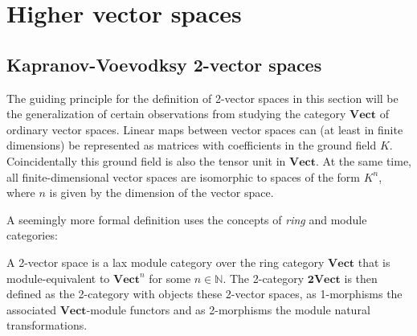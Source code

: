 \section{Higher vector spaces}
\subsection{Kapranov-Voevodksy 2-vector spaces}

    The guiding principle for the definition of 2-vector spaces in this section will be the generalization of certain observations from studying the category $\mathbf{Vect}$ of ordinary vector spaces. Linear maps between vector spaces can (at least in finite dimensions) be represented as matrices with coefficients in the ground field $K$. Coincidentally this ground field is also the tensor unit in $\mathbf{Vect}$. At the same time, all finite-dimensional vector spaces are isomorphic to spaces of the form $K^n$, where $n$ is given by the dimension of the vector space.


    A seemingly more formal definition uses the concepts of \textit{ring} and module categories:
    \begin{adefinition}
        A 2-vector space is a lax module category over the ring category $\mathbf{Vect}$ that is module-equivalent to $\mathbf{Vect}^n$ for some $n\in\mathbb{N}$. The 2-category $\mathbf{2Vect}$ is then defined as the 2-category with objects these 2-vector spaces, as 1-morphisms the associated $\mathbf{Vect}$-module functors and as 2-morphisms the module natural transformations.
    \end{adefinition}


